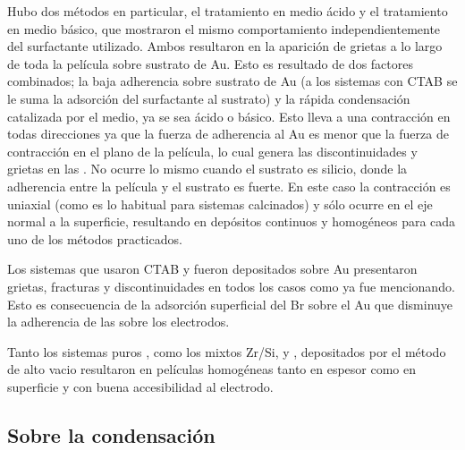 			Hubo dos métodos en particular, el tratamiento en medio ácido y el tratamiento en medio básico, que mostraron el mismo comportamiento independientemente del surfactante utilizado. Ambos resultaron en la aparición de grietas a lo largo de toda la película sobre sustrato de Au. Esto es resultado de dos factores combinados; la baja adherencia sobre sustrato de Au (a los sistemas con CTAB se le suma la adsorción del surfactante al sustrato) y la rápida condensación catalizada por el medio, ya se sea ácido o básico. Esto lleva a una contracción en todas direcciones ya que la fuerza de adherencia al Au es menor que la fuerza de contracción en el plano de la película, lo cual genera las discontinuidades y grietas en las \pdm. No ocurre lo mismo cuando el sustrato es silicio, donde la adherencia entre la película y el sustrato es fuerte. En este caso la contracción es uniaxial (como es lo habitual para sistemas calcinados) y sólo ocurre en el eje normal a la superficie, resultando en depósitos continuos y homogéneos para cada uno de los métodos practicados.

			Los sistemas que usaron CTAB y fueron depositados sobre Au presentaron grietas, fracturas y discontinuidades en todos los casos como ya fue mencionando. Esto es consecuencia de la adsorción superficial del Br sobre el Au que disminuye la adherencia de las \pdm\space sobre los electrodos. 

			Tanto los sistemas puros \pdmF, como los mixtos Zr/Si, \pdmZ\space y \pdmZB, depositados por el método de alto vacio resultaron en películas homogéneas tanto en espesor como en superficie y con buena accesibilidad al electrodo.

	\subsection{Sobre la condensación}

